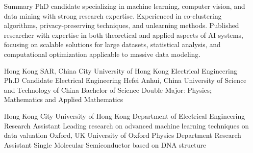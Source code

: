 \documentclass[caps, english]{financecv}
\begin{document}
\begin{cvsection}{Summary}
    PhD candidate specializing in machine learning, computer vision, and data mining with strong research expertise. Experienced in co-clustering algorithms, privacy-preserving techniques, and unlearning methods. Published researcher with expertise in both theoretical and applied aspects of AI systems, focusing on scalable solutions for large datasets, statistical analysis, and computational optimization applicable to massive data modeling.
\end{cvsection}
\education
{}
{Hong Kong SAR, China}
{City University of Hong Kong}
{Electrical Engineering}
{Ph.D Candidate}
{Electrical Engineering}
{}
{}
{Hefei Anhui, China}
{University of Science and Technology of China}
{}
{Bachelor of Science}
{Double Major: Physics; Mathematics and Applied Mathematics}
{}
{}

\experience
{}
{Hong Kong}
{City University of Hong Kong}
{Department of Electrical Engineering}
{Research Assistant}
{Leading research on advanced machine learning techniques on data valuation}
{}
{}
{Oxford, UK}
{University of Oxford}
{Physics Department}
{Research Assistant}
{Single Molecular Semiconductor based on DNA structure}
{}
{}
\end{document}
